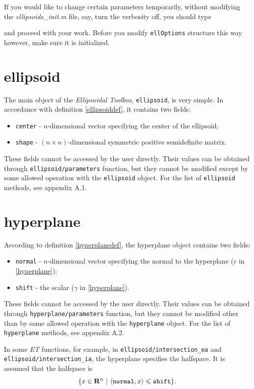 \documentclass{report}
\begin{document}
If you would like to change certain parameters temporarily, without
modifying the {\it ellipsoids\_init.m} file, say, turn the verbosity off,
you should type

and proceed with your work. Before you modify {\tt ellOptions} structure
this way however, make sure it is initialized.



\section{ellipsoid}
The main object of the {\it Ellipsoidal Toolbox}, {\tt ellipsoid}, is
very simple. In accordance with definition \ref{ellipsoiddef}, it contains
two fields:
\begin{itemize}
\item {\tt center} - $n$-dimensional vector specifying the center
of the ellipsoid;
\item {\tt shape} - $(n\times n)$-dimensional symmetric positive
semidefinite matrix.
\end{itemize}
These fields cannot be accessed by the user directly. Their values
can be obtained through {\tt ellipsoid/parameters} function, but they cannot
be modified except by some allowed operation with the {\tt ellipsoid}
object. For the list of {\tt ellipsoid} methods, see appendix A.1.



\section{hyperplane}
According to  definition \ref{hyperplanedef}, the hyperplane object
contains two fields:
\begin{itemize}
\item {\tt normal} - $n$-dimensional vector specifying the normal to
the hyperplane ($c$ in \ref{hyperplane});
\item {\tt shift} - the scalar ($\gamma$ in \ref{hyperplane}).
\end{itemize}
These fields cannot be accessed by the user directly. Their values
can be obtained through {\tt hyperplane/parameters} function, but they cannot
be modified other than by some allowed operation with the {\tt hyperplane}
object. For the list of {\tt hyperplane} methods, see appendix A.2.

In some {\it ET} functions, for example, in {\tt ellipsoid/intersection\_ea}
and {\tt ellipsoid/intersection\_ia}, the hyperplane specifies the halfspace.
It is assumed that the halfspace is
\[ \{ x\in{\bf R}^n ~|~ \langle{\tt normal},x\rangle\leq{\tt shift}\}. \]
\end{document}
